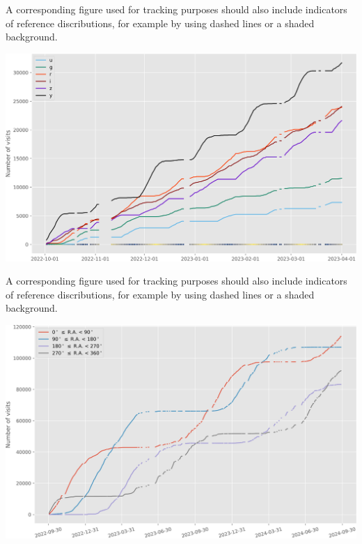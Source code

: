 A corresponding figure used for tracking purposes should also include indicators of reference discributions, for example by using dashed lines or a shaded background.
\begin{center}
\includegraphics[width=.9\linewidth]{./figures/progress_by_band.png}
\label{org1ecd9c0}
\end{center}

A corresponding figure used for tracking purposes should also include indicators of reference discributions, for example by using dashed lines or a shaded background.
\begin{center}
\includegraphics[width=.9\linewidth]{./figures/progress_by_quadrant.png}
\label{org2f940c0}
\end{center}


